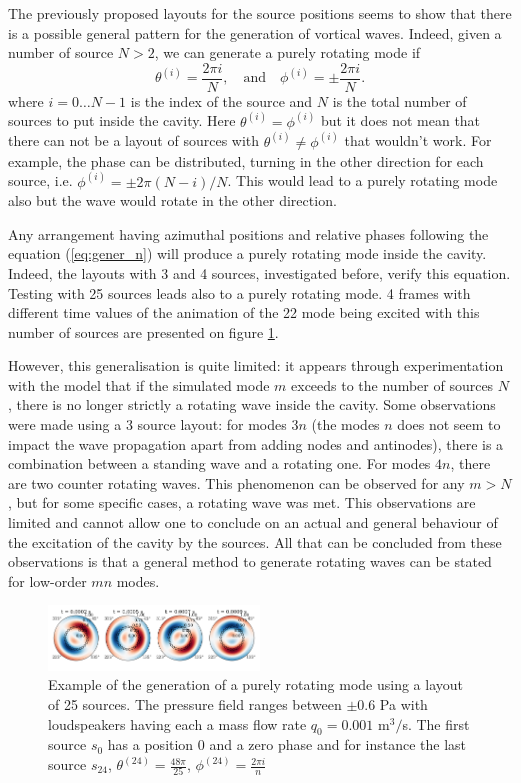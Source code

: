 \documentclass[%
 reprint,
 amsmath,amssymb,
 aps,
]{revtex4-2}
\begin{document}
The previously proposed layouts for the source positions seems to show that there is a possible general pattern for the generation of vortical waves. Indeed, given a number of source $N > 2$, we can generate a purely rotating mode if
\begin{equation}
    \theta^{(i)} = \frac{2 \pi i}{N}, \quad \text{and} \quad \phi^{(i)} = \pm \frac{2 \pi i}{N}.
    \label{eq:gener_n}
\end{equation}
where $i = 0 \ldots N-1$ is the index of the source and $N$ is the total number of sources to put inside the cavity. Here $\theta^{(i)} = \phi^{(i)}$ but it does not mean that there can not be a layout of sources with $\theta^{(i)} \ne \phi^{(i)}$ that wouldn't work. For example, the phase can be distributed, turning in the other direction for each source, i.e. $\phi^{(i)} = \pm 2\pi (N - i) / N$. This would lead to a purely rotating mode also but the wave would rotate in the other direction. 

Any arrangement having azimuthal positions and relative phases following the equation (\ref{eq:gener_n}) will produce a purely rotating mode inside the cavity. Indeed, the layouts with 3 and 4 sources, investigated before, verify this equation. Testing with 25 sources leads also to a purely rotating mode. 4 frames with different time values of the animation of the 22 mode being excited with this number of sources are presented on figure \ref{fig:pleindesources}. 

However, this generalisation is quite limited: it appears through experimentation with the model that if the simulated mode $m$ exceeds to the number of sources $N$, there is no longer strictly a rotating wave inside the cavity. Some observations were made using a 3 source layout: for modes $3n$ (the modes $n$ does not seem to impact the wave propagation apart from adding nodes and antinodes), there is a combination between a standing wave and a rotating one. For modes $4n$, there are two counter rotating waves. This phenomenon can be observed for any $m > N$, but for some specific cases, a rotating wave was met. This observations are limited and cannot allow one to conclude on an actual and general behaviour of the excitation of the cavity by the sources. All that can be concluded from these observations is that a general method to generate rotating waves can be stated for low-order $mn$ modes.

\begin{figure}
    \centering
    \includegraphics[width=0.5\textwidth]{figures/pleindesources.png}
    \caption{Example of the generation of a purely rotating mode using a layout of 25 sources. The pressure field ranges between $\pm 0.6$ Pa with loudspeakers having each a mass flow rate $q_0 = 0.001$ m$^3/$s. The first source $s_0$ has a position 0 and a zero phase and for instance the last source $s_{24}$, $\theta^{(24)} = \frac{48\pi}{25}$, $\phi^{(24)} = \frac{2 \pi i}{n}$}
    \label{fig:pleindesources}
\end{figure}
\end{document}
